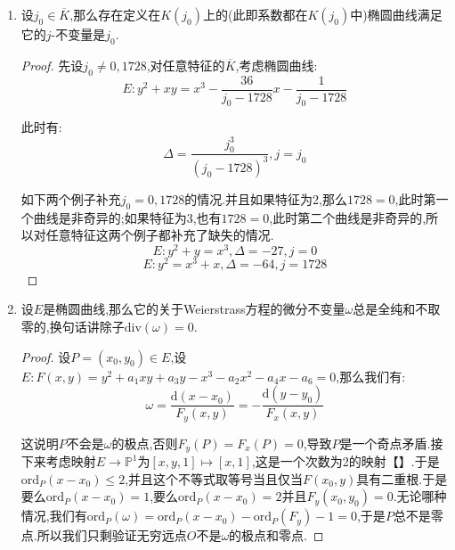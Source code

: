 \begin{enumerate}
\begin{proof}
		我们前面默认了两条椭圆曲线同构等价于对应的Weierstrass方程有仿射变换,并且这样的变换不改变$j$-不变量,这说明了必要性.对于充分性,设$E$和$E'$具有相同的$j$-不变量.由于我们假定了特征非2,3.所以可设:
		$$E:y^2=x^3+Ax+B$$
		$$E':{y'}^2={x'}^3+A'x'+B'$$
		
		按照$j(E)=j(E')$,我们就有:
		$$\frac{(4A)^3}{4A^3+27B^2}=\frac{(4A')^3}{4{A'}^3+27{B'}^2}$$
		
		展开等价于$A^3{B'}^2={A'}^3B^2$.我们的目标是找形如$(x,y)=(u^2x',u^3y')$的同构.考虑如下三种情况:
		\begin{itemize}
			\item $A=0$,此等价于$j=0$.于是$A'=0$,按照$\Delta,\Delta'\not=0$,我们有$B,B'\not=0$,取$u=(B/B')^{1/6}$就得到同构.
			\item $B=0$,此等价于$j=1728$.于是$j'\not=0$,于是$A'\not=0$,于是$B'=0$,取$u=(A/A')^{1/4}$得到同构.
			\item $AB\not=0$,此等价于$j\not=0,1728$.此时$A'B'=0$,取$u=(A/A')^{1/4}=(B/B')^{1/6}$得到同构.
		\end{itemize}
	\end{proof}
	\item 设$j_0\in\overline{K}$,那么存在定义在$K(j_0)$上的(此即系数都在$K(j_0)$中)椭圆曲线满足它的$j$-不变量是$j_0$.
	\begin{proof}
		
		先设$j_0\not=0,1728$,对任意特征的$\overline{K}$,考虑椭圆曲线:
		$$E:y^2+xy=x^3-\frac{36}{j_0-1728}x-\frac{1}{j_0-1728}$$
		
		此时有:
		$$\Delta=\frac{j_0^3}{(j_0-1728)^3},j=j_0$$
		
		如下两个例子补充$j_0=0,1728$的情况.并且如果特征为2,那么$1728=0$,此时第一个曲线是非奇异的;如果特征为3,也有$1728=0$,此时第二个曲线是非奇异的,所以对任意特征这两个例子都补充了缺失的情况.
		$$E:y^2+y=x^3,\Delta=-27,j=0$$
		$$E:y^2=x^3+x,\Delta=-64,j=1728$$
	\end{proof}
	\item 设$E$是椭圆曲线,那么它的关于Weierstrass方程的微分不变量$\omega$总是全纯和不取零的,换句话讲除子$\mathrm{div}(\omega)=0$.
	\begin{proof}
		
		设$P=(x_0,y_0)\in E$,设$E:F(x,y)=y^2+a_1xy+a_3y-x^3-a_2x^2-a_4x-a_6=0$,那么我们有:
		$$\omega=\frac{\mathrm{d}(x-x_0)}{F_y(x,y)}=-\frac{\mathrm{d}(y-y_0)}{F_x(x,y)}$$
		
		这说明$P$不会是$\omega$的极点,否则$F_y(P)=F_x(P)=0$,导致$P$是一个奇点矛盾.接下来考虑映射$E\to\mathbb{P}^1$为$[x,y,1]\mapsto[x,1]$,这是一个次数为2的映射【】.于是$\mathrm{ord}_P(x-x_0)\le2$,并且这个不等式取等号当且仅当$F(x_0,y)$具有二重根.于是要么$\mathrm{ord}_P(x-x_0)=1$,要么$\mathrm{ord}_P(x-x_0)=2$并且$F_y(x_0,y_0)=0$.无论哪种情况,我们有$\mathrm{ord}_P(\omega)=\mathrm{ord}_P(x-x_0)-\mathrm{ord}_P(F_y)-1=0$,于是$P$总不是零点.所以我们只剩验证无穷远点$O$不是$\omega$的极点和零点.
		

\end{proof}
\end{enumerate}
